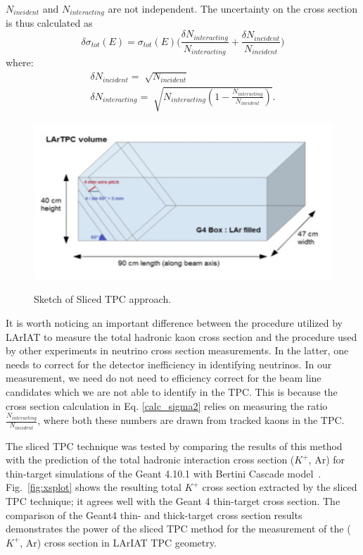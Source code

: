 $N_{incident}$ and $N_{interacting}$ are not independent.
The uncertainty on the cross section is thus calculated as 
\begin{equation}
\delta\sigma_{tot}(E) = \sigma_{tot}(E) \Big(\frac{\delta N_{interacting}}{N_{interacting}}+\frac{\delta N_{incident}}{N_{incident}}\Big) 
\end{equation}
where:
\begin{eqnarray}
\delta N_{incident} = \sqrt[]{N_{incident}} \\
\delta N_{interacting} = \sqrt[]{N_{interacting}(1-\frac{ N_{interacting}}{N_{incident}})}.
\end{eqnarray}

\begin{figure}[htpb]
\centering
\includegraphics[scale=1.25]{images/Lariat/SlicedTPC.png}\\
\caption{Sketch of Sliced TPC approach.}
\label{fig:slicedtpc}
\end{figure}

It is worth noticing an important difference between the procedure utilized by LArIAT to measure the total hadronic kaon cross section and the procedure used by other experiments in neutrino cross section measurements. In the latter, one needs to correct for the detector inefficiency in identifying neutrinos. In our measurement,  we need do not need to efficiency correct for the beam line candidates which we are not able to identify in the TPC. This is because the cross section calculation in Eq. \ref{calc_sigma2}  relies on measuring the ratio $\frac{ N_{interacting}}{N_{incident}}$, where both these numbers are drawn from tracked kaons in the TPC.


The sliced TPC technique was tested by comparing the results of this method with the prediction of the total hadronic interaction cross section ($K^{+}$, Ar) for thin-target simulations of the Geant 4.10.1 with Bertini Cascade model~\cite{geant4, g4bert}.
Fig.~\ref{fig:xsplot} shows the resulting total ${K^+}$ cross section extracted by the sliced TPC technique; it agrees well with the Geant 4 thin-target cross section.  The comparison of the Geant4 thin- and thick-target cross section results demonstrates the power of the sliced TPC method for the measurement of the ($K^{+}$, Ar) cross section in LArIAT TPC geometry. 

